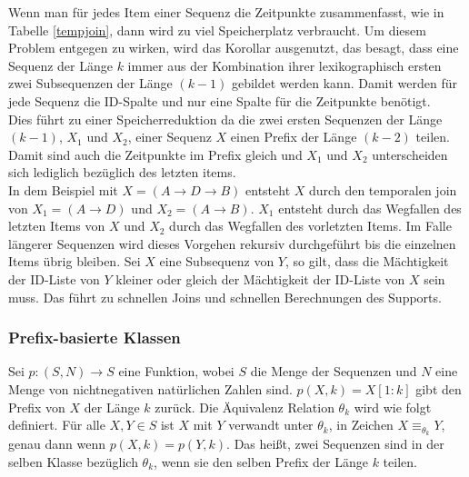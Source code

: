 Wenn man für jedes Item einer Sequenz die Zeitpunkte zusammenfasst, wie in Tabelle \ref{tempjoin}, dann wird zu viel Speicherplatz verbraucht. Um diesem Problem entgegen zu wirken, wird das Korollar ausgenutzt, das besagt, dass eine Sequenz der Länge $k$ immer aus der Kombination ihrer lexikographisch ersten zwei Subsequenzen der Länge $(k-1)$ gebildet werden kann. Damit werden für jede Sequenz die ID-Spalte und nur eine Spalte für die Zeitpunkte benötigt.\\
Dies führt zu einer Speicherreduktion da die zwei ersten Sequenzen der Länge $(k-1)$, $X_1$ und $X_2$, einer Sequenz $X$ einen Prefix der Länge $(k-2)$ teilen. Damit sind auch die Zeitpunkte im Prefix gleich und $X_1$ und $X_2$ unterscheiden sich lediglich bezüglich des letzten items.\\
In dem Beispiel mit $X=(A\rightarrow D\rightarrow B)$ entsteht $X$ durch den temporalen join von $X_1=(A\rightarrow D)$ und $X_2=(A\rightarrow B)$. $X_1$ entsteht durch das Wegfallen des letzten Items von $X$ und $X_2$ durch das Wegfallen des vorletzten Items. Im Falle längerer Sequenzen wird dieses Vorgehen rekursiv durchgeführt bis die einzelnen Items übrig bleiben. Sei $X$ eine Subsequenz von $Y$, so gilt, dass die Mächtigkeit der ID-Liste von $Y$ kleiner oder gleich der Mächtigkeit der ID-Liste von $X$ sein muss. Das führt zu schnellen Joins und schnellen Berechnungen des Supports.

\subsubsection*{Prefix-basierte Klassen}
Sei $p:(S,N)\rightarrow S$ eine Funktion, wobei $S$ die Menge der Sequenzen und $N$ eine Menge von nichtnegativen natürlichen Zahlen sind. $p(X,k)=X[1:k]$ gibt den Prefix von $X$ der Länge $k$ zurück. Die Äquivalenz Relation $\theta_k$ wird wie folgt definiert. Für alle $X,Y \in S$ ist $X$ mit $Y$ verwandt unter $\theta_k$, in Zeichen $X\equiv_{\theta_k} Y$, genau dann wenn $p(X,k)=p(Y,k)$. Das heißt, zwei Sequenzen sind in der selben Klasse bezüglich $\theta_k$, wenn sie den selben Prefix der Länge $k$ teilen.

